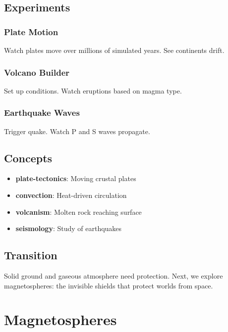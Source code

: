\documentclass[
  11pt,
  letterpaper,
  twoside,
  openright]{book}
\providecommand{\tightlist}{%
  \setlength{\itemsep}{0pt}\setlength{\parskip}{0pt}}
\begin{document}
\section{Experiments}\label{experiments-17}

\subsection{Plate Motion}\label{plate-motion}

Watch plates move over millions of simulated years. See continents
drift.

\subsection{Volcano Builder}\label{volcano-builder}

Set up conditions. Watch eruptions based on magma type.

\subsection{Earthquake Waves}\label{earthquake-waves}

Trigger quake. Watch P and S waves propagate.

\section{Concepts}\label{concepts-17}

\begin{itemize}
\tightlist
\item
  \textbf{plate-tectonics}: Moving crustal plates
\item
  \textbf{convection}: Heat-driven circulation
\item
  \textbf{volcanism}: Molten rock reaching surface
\item
  \textbf{seismology}: Study of earthquakes
\end{itemize}

\section{Transition}\label{transition-17}

Solid ground and gaseous atmosphere need protection. Next, we explore
magnetospheres: the invisible shields that protect worlds from space.

\chapter{Magnetospheres}\label{sec-magnetospheres}
\end{document}
